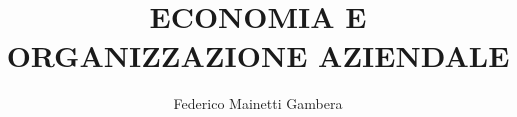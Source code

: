   
\title{ECONOMIA E ORGANIZZAZIONE AZIENDALE}
\author{Federico Mainetti Gambera}
\usepackage{amsmath}
\usepackage{amssymb}
\usepackage{graphicx}
\usepackage[italian]{babel}
\usepackage{import}
\usepackage{xifthen}
\usepackage{pdfpages}
\usepackage{transparent}
\usepackage{xcolor}
\usepackage[a4paper,left=35mm,top=26mm,right=26mm,bottom=15mm]{geometry}
\usepackage{color}
\usepackage{tcolorbox}
\usepackage{hyperref}
\renewcommand{\familydefault}{\sfdefault}

\newcommand{\incfig}[1]{%
    \def\svgwidth{\columnwidth}
    {#1.pdf_tex}
}
